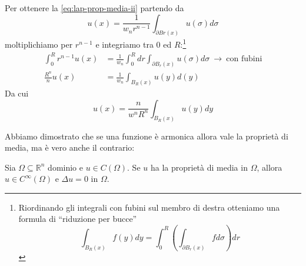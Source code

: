 \documentclass[10pt,a4paper,twoside,openright]{book}
\begin{document}
\begin{dimostrazione}
	Per ottenere la \eqref{eq:lap-prop-media-ii} partendo da
	\begin{equation*}
		u(x) =\frac{1}{w_{n} r^{n-1}}\int _{\partial Br(x)} u(\sigma) d\sigma 
	\end{equation*}
	moltiplichiamo per $\displaystyle r^{n-1}$ e integriamo tra $\displaystyle 0$ ed $\displaystyle R$:\footnote{Riordinando gli integrali con fubini sul membro di destra otteniamo una formula di ``riduzione per bucce''
		\begin{equation*}
			\int _{B_{R}(x)} f(y) dy=\int ^{R}_{0}\left(\int _{\partial B_{r}(x)} fd\sigma \right) dr
		\end{equation*}
	}
	\begin{align*}
		\int ^{R}_{0} r^{n-1} u(x) & =\frac{1}{w_{n}}\int ^{R}_{0} dr\int _{\partial B_{r}(x)} u(\sigma) d\sigma \ \rightarrow \ \text{con fubini} \\
		\frac{R^{n}}{n} u(x)       & =\frac{1}{w_{n}}\int _{B_{R}(x)} u(y) d(y)                                                                    
	\end{align*}
	Da cui 
	\begin{equation*}
		u(x) =\frac{n}{w^{n} R^{n}}\int _{B_{R}(x)} u(y) dy
	\end{equation*}
\end{dimostrazione}
Abbiamo dimostrato che se una funzione è armonica allora vale la proprietà di media, ma è vero anche il contrario:
\begin{theorem}
	Sia $\displaystyle \Omega \subseteq \mathbb{R}^{n}$ dominio e $\displaystyle u\in C(\Omega)$. Se $\displaystyle u$ ha la proprietà di media in $\displaystyle \Omega $, allora $\displaystyle u\in C^{\infty }(\Omega)$ e $\displaystyle \Delta u=0$ in $\displaystyle \Omega $.
\end{theorem}
\end{document}
